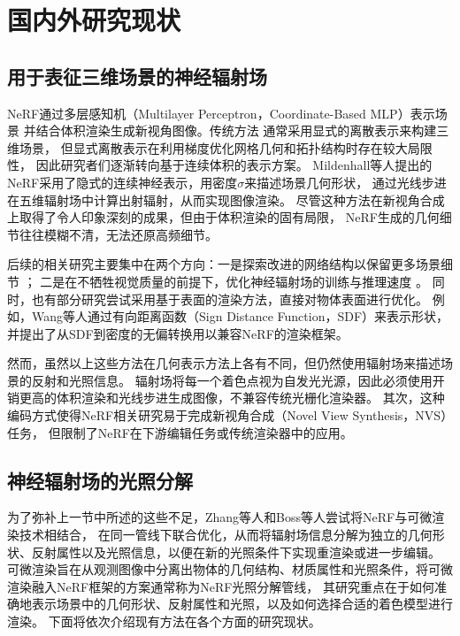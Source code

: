 \section{国内外研究现状}
\subsection{用于表征三维场景的神经辐射场}
NeRF通过多层感知机（Multilayer Perceptron，Coordinate-Based MLP）表示场景
并结合体积渲染生成新视角图像。传统方法
\cite{Waechter_2014, Mildenhall_2019, wu2020adversarial, Aliev_2020, Dai_2015}
通常采用显式的离散表示来构建三维场景，
但显式离散表示在利用梯度优化网格几何和拓扑结构时存在较大局限性，
因此研究者们逐渐转向基于连续体积的表示方案。
Mildenhall等人\cite{Mildenhall_2020}提出的NeRF采用了隐式的连续神经表示，用密度$\sigma$来描述场景几何形状，
通过光线步进在五维辐射场中计算出射辐射，从而实现图像渲染。
尽管这种方法在新视角合成上取得了令人印象深刻的成果，但由于体积渲染的固有局限，
NeRF生成的几何细节往往模糊不清，无法还原高频细节。

后续的相关研究主要集中在两个方向：一是探索改进的网络结构以保留更多场景细节
\cite{Chen_2022,Barron_2021,Barron_2022,dave2022pandora}；
二是在不牺牲视觉质量的前提下，优化神经辐射场的训练与推理速度
\cite{Reiser_2021,Martin_Brualla_2021}。
同时，也有部分研究尝试采用基于表面的渲染方法，直接对物体表面进行优化。
例如，Wang等人\cite{10.5555/3540261.3542342}通过有向距离函数（Sign Distance Function，SDF）来表示形状，
并提出了从SDF到密度的无偏转换用以兼容NeRF的渲染框架。

然而，虽然以上这些方法在几何表示方法上各有不同，但仍然使用辐射场来描述场景的反射和光照信息。
辐射场将每一个着色点视为自发光光源，因此必须使用开销更高的体积渲染和光线步进生成图像，不兼容传统光栅化渲染器。
其次，这种编码方式使得NeRF相关研究易于完成新视角合成（Novel View Synthesis，NVS）任务，
但限制了NeRF在下游编辑任务或传统渲染器中的应用。


\subsection{神经辐射场的光照分解}

为了弥补上一节中所述的这些不足，Zhang等人\cite{Zhang_2021}和Boss等人\cite{Boss_2021}尝试将NeRF与可微渲染技术相结合，
在同一管线下联合优化，从而将辐射场信息分解为独立的几何形状、反射属性以及光照信息，以便在新的光照条件下实现重渲染或进一步编辑。
可微渲染旨在从观测图像中分离出物体的几何结构、材质属性和光照条件，将可微渲染融入NeRF框架的方案通常称为NeRF光照分解管线，
其研究重点在于如何准确地表示场景中的几何形状、反射属性和光照，以及如何选择合适的着色模型进行渲染。
下面将依次介绍现有方法在各个方面的研究现状。

